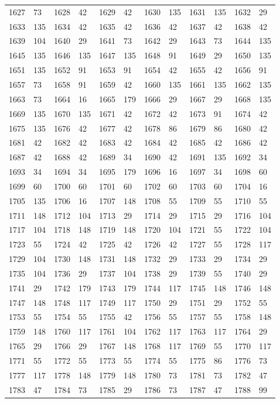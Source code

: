 \begin{longtable}{llllllllllll}
1627 & 73&1628 &42&1629& 42&1630 &135&1631 &135&1632& 29\\
1633 & 135&1634 &42&1635& 42&1636 &42&1637 &42&1638& 42\\
1639 & 104&1640 &29&1641& 73&1642 &29&1643 &73&1644& 135\\
1645 & 135&1646 &135&1647& 135&1648 &91&1649 &29&1650& 135\\
1651 & 135&1652 &91&1653& 91&1654 &42&1655 &42&1656& 91\\
1657 & 73&1658 &91&1659& 42&1660 &135&1661 &135&1662& 135\\
1663 & 73&1664 &16&1665& 179&1666 &29&1667 &29&1668& 135\\
1669 & 135&1670 &135&1671& 42&1672 &42&1673 &91&1674& 42\\
1675 & 135&1676 &42&1677& 42&1678 &86&1679 &86&1680& 42\\
1681 & 42&1682 &42&1683& 42&1684 &42&1685 &42&1686& 42\\
1687 & 42&1688 &42&1689& 34&1690 &42&1691 &135&1692& 34\\
1693 & 34&1694 &34&1695& 179&1696 &16&1697 &34&1698& 60\\
1699 & 60&1700 &60&1701& 60&1702 &60&1703 &60&1704& 16\\
1705 & 135&1706 &16&1707& 148&1708 &55&1709 &55&1710& 55\\
1711 & 148&1712 &104&1713& 29&1714 &29&1715 &29&1716& 104\\
1717 & 104&1718 &148&1719& 148&1720 &104&1721 &55&1722& 104\\
1723 & 55&1724 &42&1725& 42&1726 &42&1727 &55&1728& 117\\
1729 & 104&1730 &148&1731& 148&1732 &29&1733 &29&1734& 29\\
1735 & 104&1736 &29&1737& 104&1738 &29&1739 &55&1740& 29\\
1741 & 29&1742 &179&1743& 179&1744 &117&1745 &148&1746& 148\\
1747 & 148&1748 &117&1749& 117&1750 &29&1751 &29&1752& 55\\
1753 & 55&1754 &55&1755& 42&1756 &55&1757 &55&1758& 148\\
1759 & 148&1760 &117&1761& 104&1762 &117&1763 &117&1764& 29\\
1765 & 29&1766 &29&1767& 148&1768 &117&1769 &55&1770& 117\\
1771 & 55&1772 &55&1773& 55&1774 &55&1775 &86&1776& 73\\
1777 & 117&1778 &148&1779& 148&1780 &73&1781 &73&1782& 47\\
1783 & 47&1784 &73&1785& 29&1786 &73&1787 &47&1788& 99\\

\end{longtable}
